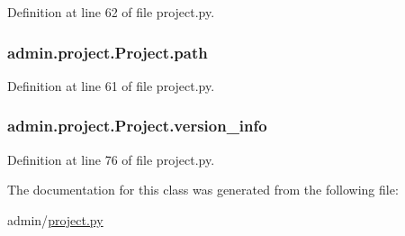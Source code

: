 Definition at line 62 of file project.\-py.

\hypertarget{classadmin_1_1project_1_1Project_a4a925408cb4575a4f8e880918decdf7d}{
\subsubsection[{path}]{\setlength{\rightskip}{0pt plus 5cm}admin.\-project.\-Project.\-path}}\label{classadmin_1_1project_1_1Project_a4a925408cb4575a4f8e880918decdf7d}


Definition at line 61 of file project.\-py.

\hypertarget{classadmin_1_1project_1_1Project_aead4e47be18c6ddbfd19d3b5aab88bda}{
\subsubsection[{version\-\_\-info}]{\setlength{\rightskip}{0pt plus 5cm}admin.\-project.\-Project.\-version\-\_\-info}}\label{classadmin_1_1project_1_1Project_aead4e47be18c6ddbfd19d3b5aab88bda}


Definition at line 76 of file project.\-py.



The documentation for this class was generated from the following file\-:\begin{DoxyCompactItemize}
\item 
admin/\hyperlink{project_8py}{project.\-py}\end{DoxyCompactItemize}

